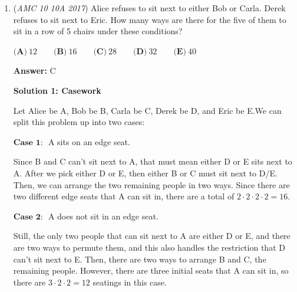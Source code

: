 \begin{enumerate}
 Extracting the desired result, we get $9-5 = \boxed{\textbf{(D)} \ 4}$.

 -ConfidentKoala4

 


 



\textbf{Solution 4}

The probability Amelia wins a round is $\frac{1}{3}$, while the probability that Blaine wins a round is $\frac{2}{3}\cdot\frac{2}{5} = \frac{4}{15}$.  Therefore, the probability Amelia wins a round, given that someone wins it, is $\frac{\frac{1}{3}}{\frac{1}{3}+\frac{4}{15}} = \frac{5}{9}$.  Since rounds where no one wins are ignored, the probability that Amelia wins is $\frac{5}{9}$, so $q-p=9-5=\boxed{\textbf{(D)} \ 4}$.

 -j314andrews

 


	\item (\textit{AMC 10 10A 2017}) Alice refuses to sit next to either Bob or Carla. Derek refuses to sit next to Eric. How many ways are there for the five of them to sit in a row of 5 chairs under these conditions?


 $\textbf{(A)}\ 12\qquad\textbf{(B)}\ 16\qquad\textbf{(C)}\ 28\qquad\textbf{(D)}\ 32\qquad\textbf{(E)}\ 40$

 \textbf{Answer: }C



\textbf{Solution 1: Casework}

Let Alice be A, Bob be B, Carla be C, Derek be D, and Eric be E.We can split this problem up into two cases:

 $\textbf{Case 1: }$ A sits on an edge seat.

 Since B and C can't sit next to A, that must mean either D or E sits next to A. After we pick either D or E, then either B or C must sit next to D/E. Then, we can arrange the two remaining people in two ways. Since there are two different edge seats that A can sit in, there are a total of $2 \cdot 2 \cdot 2 \cdot 2 = 16$.

 $\textbf{Case 2: }$ A does not sit in an edge seat.

 Still, the only two people that can sit next to A are either D or E, and there are two ways to permute them, and this also handles the restriction that D can't sit next to E. Then, there are two ways to arrange B and C, the remaining people. However, there are three initial seats that A can sit in, so there are $3 \cdot 2 \cdot 2 = 12$ seatings in this case.


\end{enumerate}

